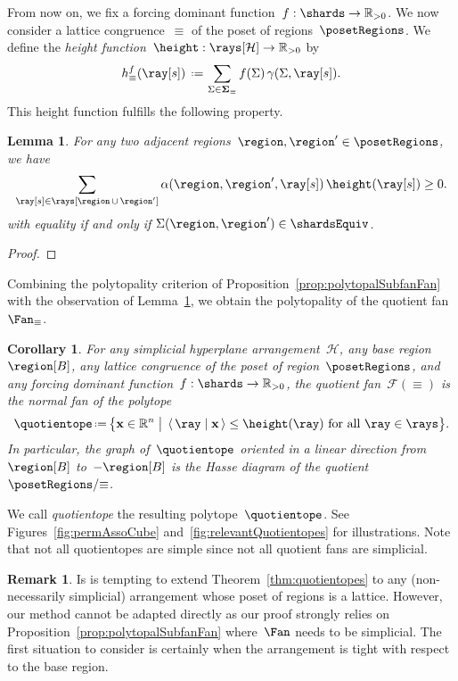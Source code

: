 \documentclass{amsart}
\newtheorem{corollary}[theorem]{Corollary}
\newtheorem{lemma}[theorem]{Lemma}
\theoremstyle{definition}
\newtheorem{remark}[theorem]{Remark}
\newcommand{\R}{\mathbb{R}} %
\renewcommand{\b}[1]{\mathbf{#1}} %
\newcommand{\bigset}[2]{\big\{ #1 \;\big|\; #2 \big\}} %
\newcommand{\dotprod}[2]{\left\langle \, #1 \; \middle| \; #2 \, \right\rangle} %
\newcommand{\eqdef}{\mbox{\,\raisebox{0.2ex}{\scriptsize\ensuremath{\mathrm:}}\ensuremath{=}\,}} %
\newcommand{\darkblue}{\color{darkblue}} %
\newcommand{\defn}[1]{\textsl{\darkblue #1}} %
\newcommand{\vincent}[1]{\todo[color=blue!30]{#1 \\ \hfill --- V.}}
\newcommand{\shard}{\Sigma}
\newcommand{\oldShards}{\boldsymbol{\Sigma}}
\newcommand{\arrangement}{\mathcal{H}} %
\newcommand{\coefficient}{\alpha} %
\newcommand{\fanEquiv}{\mathcal{F}(\equiv)} %
\begin{document}
From now on, we fix a forcing dominant function~$f : \shards \to \R_{>0}$.
We now consider a lattice congruence~$\equiv$ of the poset of regions~$\posetRegions$.
We define the \defn{height function}~$\height : \rays[\arrangement] \to \R_{>0}$ by
\[
h^f_\equiv(\ray[s]) \; \eqdef \sum_{\shard \in \oldShards_\equiv} f(\shard) \, \gamma(\shard, \ray[s]).
\]
This height function fulfills the following property.

\begin{lemma}
\label{lem:inequality}
For any two adjacent regions~$\region, \region' \in \posetRegions$, we have
\[
\sum_{\ray[s] \in \rays[\region \,\cup\, \region']} \coefficient(\region, \region', \ray[s]) \, \height(\ray[s]) \ge 0.
\]
with equality if and only if $\shard(\region, \region') \in \shardsEquiv$.
\end{lemma}

\begin{proof}

\end{proof}

Combining the polytopality criterion of Proposition~\ref{prop:polytopalSubfanFan} with the observation of Lemma~\ref{lem:inequality}, we obtain the polytopality of the quotient fan~$\Fan_\equiv$. 

\begin{corollary}
For any simplicial hyperplane arrangement~$\arrangement$, any base region~$\region[B]$, any lattice congruence of the poset of region~$\posetRegions$, and any forcing dominant function~$f : \shards \to \R_{>0}$, the quotient fan~$\fanEquiv$ is the normal fan of the polytope
\[
\quotientope \eqdef \bigset{\b{x} \in \R^n}{\dotprod{\ray}{\b{x}} \le \height(\ray) \text{ for all } \ray \in \rays}.
\]
In particular, the graph of~$\quotientope$ oriented in a linear direction from~$\region[B]$ to~$-\region[B]$ is the Hasse diagram of the quotient~$\posetRegions/{\equiv}$.
\end{corollary}

We call \defn{quotientope} the resulting polytope~$\quotientope$.
See Figures~\ref{fig:permAssoCube} and~\ref{fig:relevantQuotientopes} for illustrations.
\vincent{Add illustrations}
Note that not all quotientopes are simple since not all quotient fans are simplicial.

\begin{remark}
Is is tempting to extend Theorem~\ref{thm:quotientopes} to any (non-necessarily simplicial) arrangement whose poset of regions is a lattice.
However, our method cannot be adapted directly as our proof strongly relies on Proposition~\ref{prop:polytopalSubfanFan} where~$\Fan$ needs to be simplicial.
The first situation to consider is certainly when the arrangement is tight with respect to the base region.
\end{remark}










\label{sec:biblio}
\end{document}
